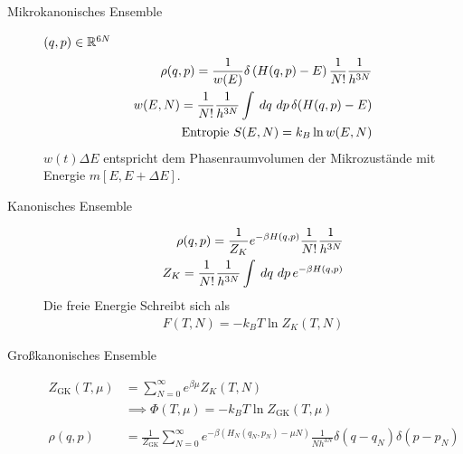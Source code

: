 \begin{description}
  \item[Mikrokanonisches Ensemble]  $(q, p ) \in \mathbb{R}^{6 N}$
    \begin{align*}
      \rho(q, p) = \frac{1}{w(E)} \delta\left( H(q,p) - E \right)
      \frac{1}{N!} \frac{1}{h^{3N}} \\
      w(E, N) = \frac{1}{N!} \frac{1}{h^{3 N}} \int_{}^{} \,dq\,\,dp\,
      \delta(H(q,p)-E) \\
      \text{Entropie } S(E, N) = k_B \ln{w(E,N)} \\
    \end{align*}
    $w(t) \Delta E$ entspricht dem Phasenraumvolumen der Mikrozust\"ande mit
    Energie $m[E, E + \Delta E]$.
  \item[Kanonisches Ensemble] 
    \begin{align*}
      \rho(q,p) = \frac{1}{Z_K} e^{-\beta H(q,p)} \frac{1}{N!} \frac{1}{h^{3N}} \\
      Z_K = \frac{1}{N!} \frac{1}{h^{3N}} \int_{}^{} \,dq\, \,dp\, e^{-\beta H(q,p)}
    \end{align*}
    Die freie Energie Schreibt sich als
    \begin{align*}
      F(T, N) = -k_B T \ln{Z_K(T,N)}
    \end{align*}
  \item[Gro\ss{}kanonisches Ensemble] 
    \begin{align*}
      Z_{\text{GK}} (T, \mu) & = \sum_{N=0}^{\infty} e^{\beta \mu} Z_K (T, N) \\
      & \implies \Phi(T, \mu) = -k_B T \ln{Z_{\text{GK}}(T,\mu)} \\
      \\
      \rho(q,p) & = \frac{1}{Z_{\text{GK}}} \sum_{N=0}^{\infty} e^{-\beta\left( 
      H_N(q_N,p_N) - \mu N\right)} \frac{1}{N h^{3N}} \delta(q-q_N) \delta(p-p_N)
    \end{align*}
\end{description}
